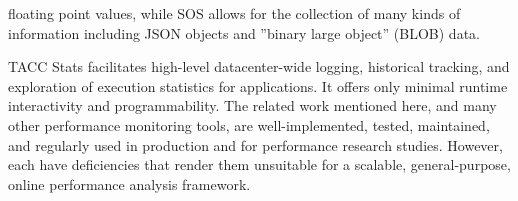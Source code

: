 floating point values, while SOS allows for the collection of many
kinds of information including JSON objects and ''binary large
object'' (BLOB) data.
%
\par
%
TACC Stats \cite{evans2014comprehensive} facilitates high-level
datacenter-wide logging, historical tracking, and exploration of
execution statistics for applications.  It offers only minimal
runtime interactivity and programmability.
%
The related work mentioned here, and many other performance monitoring
tools, are well-implemented, tested, maintained, and regularly used
in production and for performance research studies.
%
However, each have deficiencies that render them unsuitable for a
scalable, general-purpose, online performance analysis framework.
%


